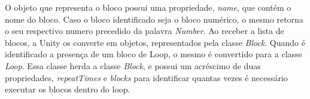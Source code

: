     O objeto que representa o bloco possui uma propriedade, \textit{name}, que contém o nome do bloco. Caso o bloco identificado seja o bloco numérico, o mesmo retorna o seu respectivo numero precedido da palavra \textit{Number}.
    Ao receber a lista de blocos, a Unity os converte em objetos, representados pela classe \textit{Block}. Quando é identificado a presença de um bloco de Loop, o mesmo é convertido para a classe \textit{Loop}. Essa classe herda a classe \textit{Block}, e possui um acréscimo de duas propriedades, \textit{repeatTimes} e \textit{blocks} para identificar quantas vezes é necessário executar os blocos dentro do loop.
    
    
    